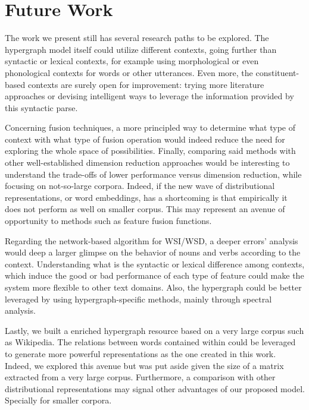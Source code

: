 \section{Future Work}
The work we present still has several research paths to be explored.
The hypergraph model itself could utilize different contexts, going further than syntactic or lexical contexts, for example using morphological or even phonological contexts for words or other utterances. Even more, the constituent-based contexts are surely open for improvement: trying more literature approaches or devising intelligent ways to leverage the information provided by this syntactic parse.


Concerning fusion techniques, a more principled way to determine what type of context with what type of fusion operation would indeed reduce the need for exploring the whole space of possibilities. Finally,  comparing said methods with other well-established dimension reduction approaches would be interesting to understand the trade-offs of lower performance versus dimension reduction, while focusing on not-so-large corpora. Indeed, if the new wave of distributional representations, or word embeddings, has a shortcoming is that empirically it does not perform as well on smaller corpus. This may represent an avenue of opportunity to methods such as feature fusion functions.


Regarding the network-based algorithm for WSI/WSD, a deeper errors' analysis would deep a larger glimpse on the behavior of nouns and verbs according to the context. Understanding what is the syntactic or lexical difference among contexts, which induce the good or bad performance of each type of feature could make the system more flexible to other text domains. Also, the hypergraph could be better leveraged by using hypergraph-specific methods, mainly through spectral analysis.

Lastly, we built a enriched hypergraph resource based on a very large corpus such as Wikipedia. The relations between words contained within could be leveraged to generate more powerful representations as the one created in this work. Indeed, we explored this avenue but was put aside given the size of a matrix extracted from a very large corpus. Furthermore, a comparison with other distributional representations may signal other advantages of our proposed model. Specially for smaller corpora. 


